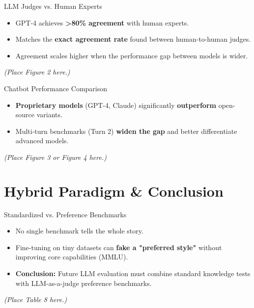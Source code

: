 \documentclass[10pt]{beamer}
\begin{document}
\begin{frame}{LLM Judges vs. Human Experts}
  \begin{itemize}
    \item GPT-4 achieves \textbf{>80\% agreement} with human experts.
    \item Matches the \textbf{exact agreement rate} found between human-to-human judges.
    \item Agreement scales higher when the performance gap between models is wider.
  \end{itemize}
  \vspace{0.3cm}
  \textit{(Place Figure 2 here.)}
\end{frame}

\begin{frame}{Chatbot Performance Comparison}
  \begin{itemize}
    \item \textbf{Proprietary models} (GPT-4, Claude) significantly \textbf{outperform} open-source variants.
    \item Multi-turn benchmarks (Turn 2) \textbf{widen the gap} and better differentiate advanced models.
  \end{itemize}
  \vspace{0.3cm}
  \textit{(Place Figure 3 or Figure 4 here.)}
\end{frame}

\section{Hybrid Paradigm \& Conclusion}

\begin{frame}{Standardized vs. Preference Benchmarks}
  \begin{itemize}
    \item No single benchmark tells the whole story.
    \item Fine-tuning on tiny datasets can \textbf{fake a "preferred style"} without improving core capabilities (MMLU).
    \item \textbf{Conclusion:} Future LLM evaluation must combine standard knowledge tests with LLM-as-a-judge preference benchmarks.
  \end{itemize}
  \vspace{0.3cm}
  \textit{(Place Table 8 here.)}
\end{frame}
\end{document}
